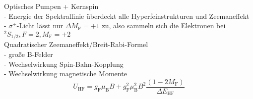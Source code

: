 Optisches Pumpen + Kernspin\\
- Energie der Spektrallinie überdeckt alle Hyperfeinstrukturen und Zeemaneffekt\\
- $\sigma^{+}$-Licht lässt nur $\Delta M_{\text{F}}= +1$ zu, also sammeln sich die Elektronen bei $^{2}S_{1/2}, F=2, M_{\text{F}}=+2$ \\

Quadratischer Zeemaneffekt/Breit-Rabi-Formel\\
- große B-Felder\\
- Wechselwirkung Spin-Bahn-Kopplung\\
- Wechselwirkung magnetische Momente\\
\begin{equation}
U_{\text{HF}}= g_{\text{F}} \mu_{\text{B}} B + g_{\text{F}}^2 \mu_{\text{B}}^2 B^2 \frac{(1- 2M_{\text{F}})}{\Delta E_{\text{HF}}}
\label{eqn:quadzeeman}
\end{equation}
